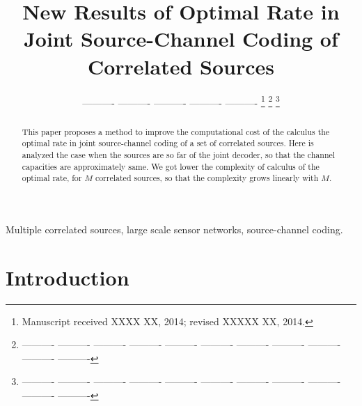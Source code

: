 \documentclass[journal]{IEEEtran}
\begin{document}
\title{New Results of Optimal Rate in Joint Source-Channel Coding of Correlated Sources}


\author{---------- ---------- ---------- ---------- ---------- %
\thanks{Manuscript received XXXX XX, 2014; revised XXXXX XX, 2014.}
\thanks{---------- ---------- ---------- ---------- ---------- ---------- ---------- ---------- ---------- ---------- ---------- }%
\thanks{---------- ---------- ---------- ---------- ---------- ---------- ---------- ---------- ---------- ---------- ---------- }}%


\maketitle


\begin{abstract}
This paper proposes a method to improve the computational cost of the calculus the optimal rate in 
joint source-channel coding of a set of correlated sources. Here is analyzed 
the case when the sources  are so far of the joint decoder, so that the channel 
capacities  are approximately same. We got lower the complexity of calculus of 
the optimal rate, for $M$ correlated sources, so that the complexity grows linearly 
with $M$.

\end{abstract}

\begin{keywords}
Multiple correlated sources, large scale sensor networks, source-channel coding.
\end{keywords}

\IEEEpeerreviewmaketitle
\section{Introduction}
\label{sec:Intro}
\end{document}
